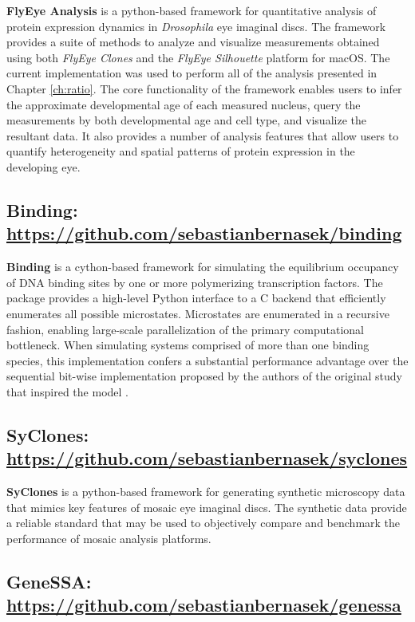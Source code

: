 \textbf{FlyEye Analysis} is a python-based framework for quantitative analysis of protein expression dynamics in \textit{Drosophila} eye imaginal discs. The framework provides a suite of methods to analyze and visualize measurements obtained using both \emph{FlyEye Clones} and the \emph{FlyEye Silhouette} platform for macOS. The current implementation was used to perform all of the analysis presented in Chapter \ref{ch:ratio}. The core functionality of the framework enables users to infer the approximate developmental age of each measured nucleus, query the measurements by both developmental age and cell type, and visualize the resultant data. It also provides a number of analysis features that allow users to quantify heterogeneity and spatial patterns of protein expression in the developing eye. 
 
\subsection{\textbf{Binding}: \url{https://github.com/sebastianbernasek/binding}}
\label{appendix:resources:binding}

\textbf{Binding} is a cython-based framework for simulating the equilibrium occupancy of DNA binding sites by one or more polymerizing transcription factors. The package provides a high-level Python interface to a C backend that efficiently enumerates all possible microstates. Microstates are enumerated in a recursive fashion, enabling large-scale parallelization of the primary computational bottleneck. When simulating systems comprised of more than one binding species, this implementation confers a substantial performance advantage over the sequential bit-wise implementation proposed by the authors of the original study that inspired the model \cite{Hope2017}.

\subsection{\textbf{SyClones}: \url{https://github.com/sebastianbernasek/syclones}}
\label{appendix:resources:syclones}

\textbf{SyClones} is a python-based framework for generating synthetic microscopy data that mimics key features of mosaic eye imaginal discs. The synthetic data provide a reliable standard that may be used to objectively compare and benchmark the performance of mosaic analysis platforms.

\subsection{\textbf{GeneSSA}: \url{https://github.com/sebastianbernasek/genessa}}
\label{appendix:resources:genessa}

